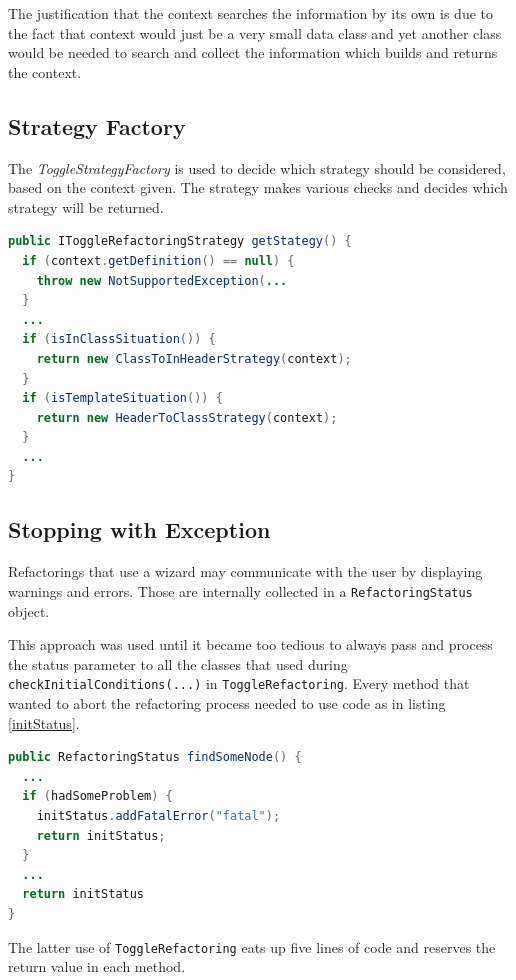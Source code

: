 The justification that the context searches the information by its own is due
to the fact that context would just be a very small data class and yet another
class would be needed to search and collect the information which builds and
returns the context.

\subsection{Strategy Factory}
\label{factory}

The \textit{ToggleStrategyFactory} is used to decide which strategy should be 
considered, based on the context given. The strategy makes various checks
and decides which strategy will be returned.

\begin{lstlisting}[caption={IToggleRefactoringStrategy},
label={strategy}, language=Java]
public IToggleRefactoringStrategy getStategy() {
  if (context.getDefinition() == null) {
    throw new NotSupportedException(...
  }
  ...
  if (isInClassSituation()) {
    return new ClassToInHeaderStrategy(context);
  }
  if (isTemplateSituation()) {
    return new HeaderToClassStrategy(context);
  }
  ...
}
\end{lstlisting}

\subsection{Stopping with Exception}
Refactorings that use a wizard may communicate with the user by displaying 
warnings and errors. Those are internally collected in a 
\texttt{RefactoringStatus} object.

This approach was used until it became too tedious to always pass and process 
the status parameter to all the classes that used during 
\texttt{checkInitialConditions(...)} in \texttt{ToggleRefactoring}.
Every method that wanted to abort the refactoring process needed to use code as 
in listing \ref{initStatus}.

\begin{lstlisting}[caption={exemplary use of the RefactoringStatus},
label={initStatus}, language=Java]
public RefactoringStatus findSomeNode() {
  ...
  if (hadSomeProblem) {
    initStatus.addFatalError("fatal");
    return initStatus;
  }
  ...
  return initStatus
}
\end{lstlisting}

The latter use of \texttt{ToggleRefactoring} eats up five lines of code and 
reserves the return value in each method.



